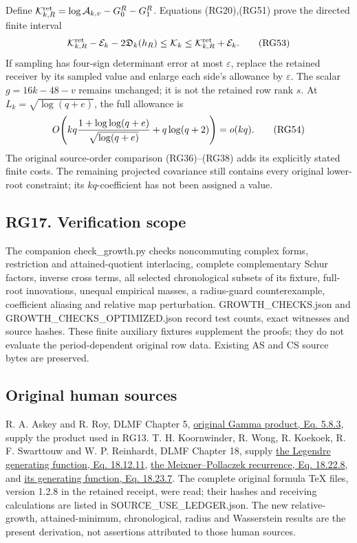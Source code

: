 \documentclass[11pt]{article}
\begin{document}
Define \(\mathcal K_{k,R}^{\rm ret}=\log\mathcal A_{k,v}-G_0^R-G_1^R\). Equations (RG20),(RG51) prove the directed finite interval \[
\mathcal K_{k,R}^{\rm ret}-\mathcal E_k-2\mathfrak D_k(h_R)
\le\mathcal K_k\le\mathcal K_{k,R}^{\rm ret}+\mathcal E_k.
\tag{RG53}
\] If sampling has four-sign determinant error at most \(\varepsilon\), replace the retained receiver by its sampled value and enlarge each side's allowance by \(\varepsilon\). The scalar \(g=16k-48-v\) remains unchanged; it is not the retained row rank \(s\). At \(L_k=\sqrt{\log(q+e)}\), the full allowance is \[
O\!\left(kq{1+\log\log(q+e)\over\sqrt{\log(q+e)}}+q\log(q+2)\right)=o(kq).
\tag{RG54}
\] The original source-order comparison (RG36)--(RG38) adds its explicitly stated finite costs. The remaining projected covariance still contains every original lower-root constraint; its \(kq\)-coefficient has not been assigned a value.

\subsection{RG17. Verification scope}\label{rg17.-verification-scope}

The companion check\_growth.py checks noncommuting complex forms, restriction and attained-quotient interlacing, complete complementary Schur factors, inverse cross terms, all selected chronological subsets of its fixture, full-root innovations, unequal empirical masses, a radius-guard counterexample, coefficient aliasing and relative map perturbation. GROWTH\_CHECKS.json and GROWTH\_CHECKS\_OPTIMIZED.json record test counts, exact witnesses and source hashes. These finite auxiliary fixtures supplement the proofs; they do not evaluate the period-dependent original row data. Existing AS and CS source bytes are preserved.

\subsection{Original human sources}\label{original-human-sources}

R. A. Askey and R. Roy, DLMF Chapter 5, \href{https://dlmf.nist.gov/5.8.E3}{original Gamma product, Eq. 5.8.3}, supply the product used in RG13. T. H. Koornwinder, R. Wong, R. Koekoek, R. F. Swarttouw and W. P. Reinhardt, DLMF Chapter 18, supply \href{https://dlmf.nist.gov/18.12.E11}{the Legendre generating function, Eq. 18.12.11}, \href{https://dlmf.nist.gov/18.22.E8}{the Meixner--Pollaczek recurrence, Eq. 18.22.8}, and \href{https://dlmf.nist.gov/18.23.E7}{its generating function, Eq. 18.23.7}. The complete original formula TeX files, version 1.2.8 in the retained receipt, were read; their hashes and receiving calculations are listed in SOURCE\_USE\_LEDGER.json. The new relative-growth, attained-minimum, chronological, radius and Wasserstein results are the present derivation, not assertions attributed to those human sources.
\end{document}
